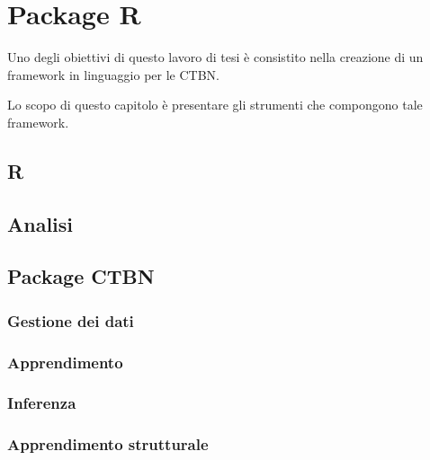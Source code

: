 
\chapter{Package R}
\label{cap:ctbnr}
Uno degli obiettivi di questo lavoro di tesi è consistito nella creazione di un framework in linguaggio  per le \acs{CTBN}.

Lo scopo di questo capitolo è presentare gli strumenti che compongono tale framework.

\section{R}
\omissis{}

\section{Analisi}
\omissis{}


\section{Package CTBN}
\omissis{}

\subsection{Gestione dei dati}\label{subsec:rctbn-ds-management}
\omissis{}

\subsection{Apprendimento}\label{subsec:rctbn-learning}
\omissis{}

\subsection{Inferenza}\label{subsec:rctbn-inference}
\omissis{}

\subsection{Apprendimento strutturale}\label{subsec:rctbn-structurallearning}
\omissis{}


